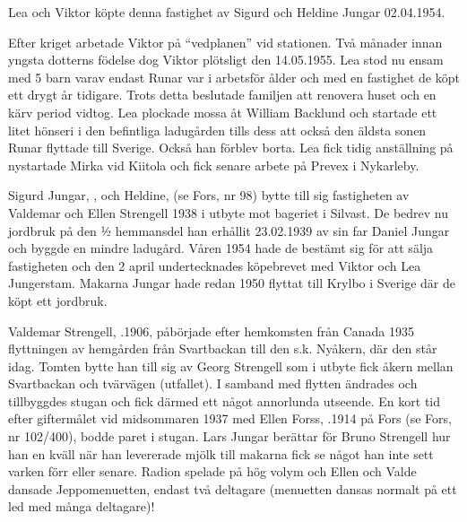 Lea och Viktor köpte denna fastighet av Sigurd och Heldine Jungar 02.04.1954.
\begin{jhchildren}
  \item {}
  \item {}
  \item {}
  \item {}
\end{jhchildren}
Efter kriget arbetade Viktor på ``vedplanen'' vid stationen. Två månader innan yngsta dotterns födelse dog Viktor plötsligt den 14.05.1955. Lea stod nu ensam med 5 barn varav endast Runar var i arbetsför ålder och med en fastighet de köpt ett drygt år tidigare. Trots detta beslutade familjen att renovera huset och en kärv period vidtog. Lea plockade mossa åt William Backlund och startade ett litet hönseri i den befintliga ladugården tills dess att också den äldsta sonen Runar flyttade till Sverige. Också han förblev borta. Lea fick tidig anställning på nystartade Mirka vid Kiitola och fick senare arbete på Prevex i Nykarleby.


Sigurd Jungar, , och Heldine,  (se Fors, nr 98) bytte till sig fastigheten av Valdemar och Ellen Strengell 1938 i utbyte mot bageriet i Silvast. De bedrev nu jordbruk på den ½ hemmansdel han erhållit 23.02.1939 av sin far Daniel Jungar och byggde en mindre ladugård. Våren 1954 hade de bestämt sig för att sälja fastigheten och den 2 april undertecknades köpebrevet med Viktor och Lea Jungerstam. Makarna Jungar hade redan 1950 flyttat till Krylbo i Sverige där de köpt ett jordbruk.


Valdemar Strengell, .1906, påbörjade efter hemkomsten från Canada 1935 flyttningen av hemgården från Svartbackan till den s.k. Nyåkern, där den står idag. Tomten bytte han till sig av Georg Strengell som i utbyte fick åkern mellan Svartbackan och tvärvägen (utfallet). I samband med flytten ändrades och tillbyggdes stugan och fick därmed
ett något annorlunda utseende. En kort tid efter giftermålet vid midsommaren 1937 med Ellen Forss, .1914 på Fors (se Fors, nr 102/400), bodde paret i stugan. Lars Jungar berättar för Bruno Strengell hur han en kväll när han levererade mjölk till makarna fick se något han inte sett varken förr eller senare. Radion spelade på hög volym och Ellen och Valde dansade Jeppomenuetten, endast två deltagare (menuetten dansas normalt på ett led med många deltagare)!

